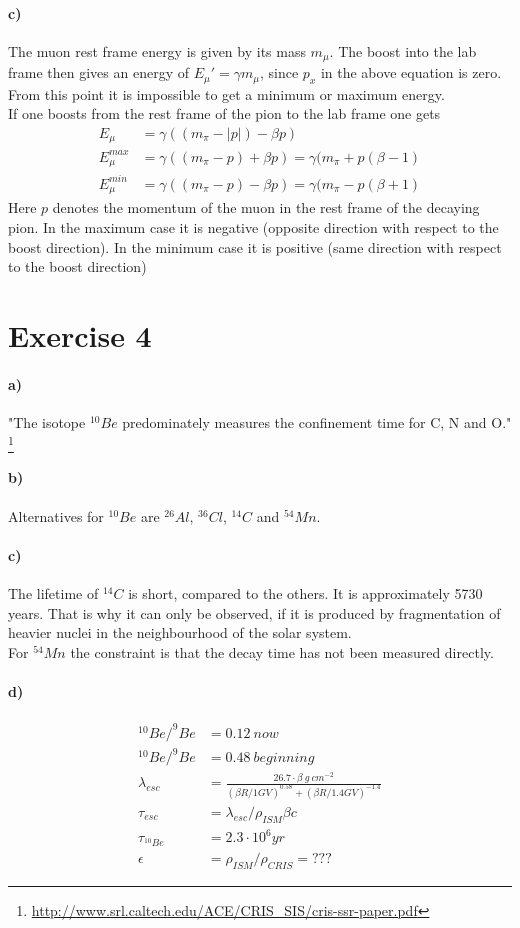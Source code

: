 \documentclass[10pt,a4paper]{article}
\begin{document}
\paragraph{c)}
The muon rest frame energy is given by its mass $m_\mu$. The boost into the lab frame then gives an energy of $E_\mu' = \gamma m_\mu$, since $p_x$ in the above equation is zero. From this point it is impossible to get a minimum or maximum energy.\\
If one boosts from the rest frame of the pion to the lab frame one gets
\begin{align*}
E_\mu &= \gamma ( (m_\pi - |p|) - \beta p) \\
E_\mu^{max} &= \gamma ( (m_\pi - p) + \beta p) = \gamma (m_\pi + p (\beta - 1)\\
E_\mu^{min} &= \gamma ( (m_\pi - p) - \beta p) = \gamma (m_\pi - p (\beta + 1)
\end{align*}
Here $p$ denotes the momentum of the muon in the rest frame of the decaying pion. In the maximum case it is negative (opposite direction with respect to the boost direction). In the minimum case it is positive (same direction with respect to the boost direction)


\section*{Exercise 4}
\paragraph{a)}
"The isotope $^{10}Be$ predominately measures the confinement time for C, N and O." \footnote{\url{http://www.srl.caltech.edu/ACE/CRIS_SIS/cris-ssr-paper.pdf}}
\paragraph{b)}
Alternatives for $^{10}Be$ are $^{26}Al$, $^{36}Cl$, $^{14}C$ and $^{54}Mn$.
\paragraph{c)}
The lifetime of $^{14}C$ is short, compared to the others.
It is approximately 5730 years. That is why it can only be observed, if it is produced by fragmentation of heavier nuclei in the neighbourhood of the solar system.\\
For $^{54}Mn$ the constraint is that the decay time has not been measured directly.
\paragraph{d)}
\begin{align*}
^{10}Be/^{9}Be &= 0.12\ now\\
^{10}Be/^{9}Be &= 0.48\ beginning\\
\lambda_{esc} &= \frac{26.7\cdot \beta \ g\ cm^{-2}}{(\beta R / 1GV)^{0.58}+(\beta R / 1.4GV)^{-1.4}}\\
\tau_{esc} &= \lambda_{esc} / \rho_{ISM} \beta c \\
\tau_{^{10}Be} &= 2.3 \cdot 10^6 yr\\
\epsilon &= \rho_{ISM} / \rho_{CRIS} = ???
\end{align*}
\end{document}
